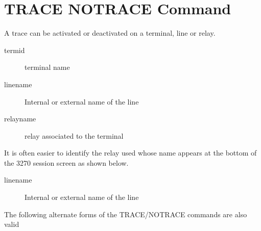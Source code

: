 \documentclass[letterpaper,10pt,english]{sphinxmanual}
\begin{document}
\section{TRACE \textbar{} NOTRACE Command}
\label{\detokenize{audit_operations_ and_performance:trace-notrace-command}}\label{\detokenize{audit_operations_ and_performance:index-28}}
A trace can be activated or deactivated on a terminal, line or relay.

\begin{sphinxVerbatim}[commandchars=\\\{\}]
\end{sphinxVerbatim}
\begin{description}
\item[{termid}] \leavevmode
terminal name

\item[{linename}] \leavevmode
Internal or external name of the line

\item[{relayname}] \leavevmode
relay associated to the terminal

\end{description}

It is often easier to identify the relay used whose name appears at the bottom of the 3270 session screen as shown below.

\begin{description}
\item[{linename}] \leavevmode
Internal or external name of the line

\end{description}

The following alternate forms of the TRACE/NOTRACE commands are also  valid
\end{document}
